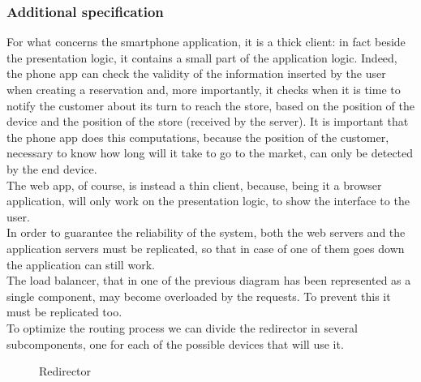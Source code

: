 \subsubsection{Additional specification}
For what concerns the smartphone application, it is a thick client: in fact beside the presentation logic, it contains a small part of the application logic. Indeed, the phone app can check the validity of the information inserted by the user when creating a reservation and, more importantly, it checks when it is time to notify the customer about its turn to reach the store, based on the position of the device and the position of the store (received by the server). It is important that the phone app does this computations, because the position of the customer, necessary to know how long will it take to go to the market, can only be detected by the end device.\\
The web app, of course, is instead a thin client, because, being it a browser application, will only work on the presentation logic, to show the interface to the user.\\
In order to guarantee the reliability of the system, both the web servers and the application servers must be replicated, so that in case of one of them goes down the application can still work.\\
The load balancer, that in one of the previous diagram has been represented as a single component, may become overloaded by the requests. To prevent this it must be replicated too.\\
To optimize the routing process we can divide the redirector in several subcomponents, one for each of the possible devices that will use it.\\
\begin{figure}[H]
	\noindent
	\caption{Redirector} 
\end{figure}
